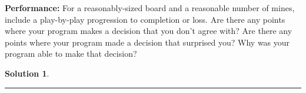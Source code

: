 \documentclass{article}
\theoremstyle{definition}
\def\fline{\rule{0.75\linewidth}{0.5pt}}
\newcommand{\finishline}{\vspace{-15pt}\begin{center}\fline\end{center}}
\newtheorem*{solution*}{Solution}
\newenvironment{solution}{\begin{solution*}}{{\finishline} \end{solution*}}
\begin{document}
\smallskip

\textbf{Performance: }
	For a reasonably-sized board and a reasonable number of mines, include a play-by-play progression to completion or loss. Are there any points where your program makes a decision that you don’t agree with?
Are there any points where your program made a decision that surprised you? 
Why was your program able to make that decision? 
\begin{solution} \hfill \\

    \begin{figure}[h]
	\centering
	\end{figure}


\end{solution}
\end{document}
